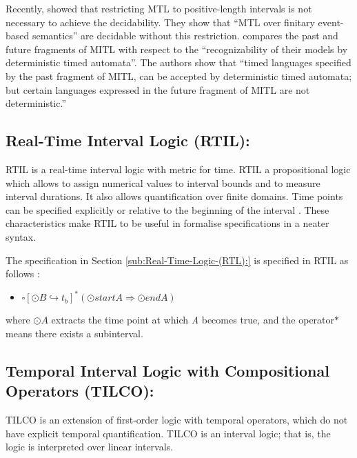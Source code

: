 \documentclass[11pt]{article}
\begin{document}
Recently, \cite{OW05,LW08} showed that restricting MTL to positive-length intervals is not necessary to achieve the decidability. They show that ``MTL over finitary event-based semantics'' are decidable without this restriction.  \cite{MNP05} compares the past and future fragments of  MITL with respect to the ``recognizability of their models by deterministic timed automata''. The authors show that ``timed languages specified by the past fragment of MITL, can be accepted by deterministic timed automata; but certain languages expressed in the future fragment of MITL are not deterministic.''

\subsection{Real-Time Interval Logic (RTIL): }

RTIL \cite{RG89} is a real-time interval logic with metric for time.  RTIL a propositional logic which allows to assign numerical values to interval bounds and to measure interval durations.  It also allows quantification over finite domains. Time points can be specified explicitly or relative to the beginning of the interval  \cite{BMN00}. These characteristics make RTIL to be useful in formalise specifications in a neater syntax. 

The specification in Section \ref{sub:Real-Time-Logic-(RTL):} is specified in RTIL as follows \cite{BMN00}:

\begin{itemize}
\item $\square\left[\odot B\hookrightarrow t_{b}\right]^{*}(\odot startA\Rightarrow\odot endA)$
\end{itemize}

\noindent where $\odot A$ extracts the time point at which \emph{A} becomes true, and the operator$*$ means there exists a subinterval.


















\subsection{Temporal Interval Logic with Compositional Operators (TILCO):}

TILCO \cite{Mat96,MN96} is an extension of first-order logic with temporal operators, which do not have explicit temporal quantification. TILCO is an interval logic; that is, the logic is interpreted over linear intervals.   
\end{document}
